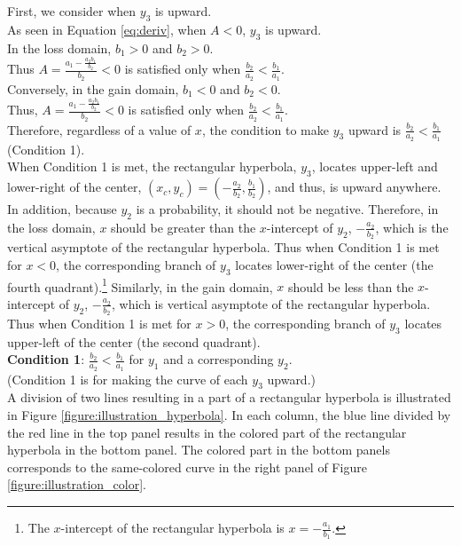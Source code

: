 \documentclass[11pt, a4paper]{article}
\begin{document}
\noindent
First, we consider when $y_3$ is upward.\\ 
As seen in Equation \ref{eq:deriv}, when $A<0$, $y_3$ is upward.\\

\noindent
In the loss domain, $b_1>0$ and $b_2>0$.\\
Thus $A = \frac{a_1-\frac{a_2 b_1}{b_2}}{b_2}<0$ is satisfied only when  $\frac{b_2}{a_2} < \frac{b_1}{a_1}$.\\

\noindent
Conversely, in the gain domain, $b_1<0$ and $b_2<0$.\\
Thus, $A = \frac{a_1-\frac{a_2 b_1}{b_2}}{b_2}<0$ is satisfied only when $\frac{b_2}{a_2} < \frac{b_1}{a_1}$.\\

\noindent
Therefore, regardless of a value of $x$, the condition to make $y_3$ upward is $\frac{b_2}{a_2} < \frac{b_1}{a_1}$  (Condition 1).\\

\noindent
When Condition 1 is met, the rectangular hyperbola, $y_3$, locates upper-left and lower-right of the center, $(x_c, y_c) = (-\frac{a_2}{b_2}, \frac{b_1}{b_2})$, and thus, is upward anywhere.\\

\noindent
In addition, because $y_2$ is a probability, it should not be negative. Therefore, in the loss domain, $x$ should be greater than the $x$-intercept of $y_2$, $-\frac{a_2}{b_2}$, which is the vertical asymptote of the rectangular hyperbola. Thus when Condition 1 is met for $x<0$, the corresponding branch of $y_3$ locates lower-right of the center (the fourth quadrant).\footnote{The $x$-intercept of the rectangular hyperbola is $x=-\frac{a_1}{b_1}$.}
Similarly, in the gain domain, $x$ should be less than the $x$-intercept of $y_2$, $-\frac{a_2}{b_2}$, which is vertical asymptote of the rectangular hyperbola. Thus when Condition 1 is met for $x>0$, the corresponding branch of $y_3$ locates upper-left of the center (the second quadrant).\\ 

\noindent
\textbf{Condition 1}: $\frac{b_2}{a_2} < \frac{b_1}{a_1}$ for $y_1$ and a corresponding $y_2$.\\
(Condition 1 is for making the curve of each $y_3$ upward.)\\

\noindent
A division of two lines resulting in a part of a rectangular hyperbola is illustrated in Figure \ref{figure:illustration_hyperbola}. In each column, the blue line divided by the red line in the top panel results in the colored part of the rectangular hyperbola in the bottom panel. The colored part in the bottom panels corresponds to the same-colored curve in the right panel of Figure \ref{figure:illustration_color}.
\end{document}
